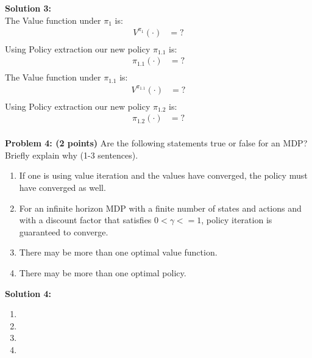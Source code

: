 \documentclass[]{article}
\begin{document}
\textbf{Solution 3:} \\
The Value function under $\pi_1$ is:\\
\begin{equation*}
\begin{split}
    V^{\pi_1}(\cdot) &= ? \\
\end{split}
\end{equation*}
Using Policy extraction our new policy $\pi_{1.1}$ is:
\begin{equation*}
\begin{split}
    \pi_{1.1}(\cdot) &= ? \\
\end{split}
\end{equation*}
The Value function under $\pi_{1.1}$ is:\\
\begin{equation*}
\begin{split}
    V^{\pi_{1.1}}(\cdot) &= ? \\
\end{split}
\end{equation*}
Using Policy extraction our new policy $\pi_{1.2}$ is:
\begin{equation*}
\begin{split}
    \pi_{1.2}(\cdot) &= ? \\
\end{split}
\end{equation*}

\clearpage
\textbf{Problem 4: (2 points)}
Are the following statements true or false for an MDP? Briefly explain why (1-3 sentences).
\begin{enumerate}[label=(\alph*)]
    \item If one is using value iteration and the values have converged, the policy must have converged as well.
    \item For an infinite horizon MDP with a finite number of states and actions and with a discount factor that satisfies $0 < \gamma <= 1$, policy iteration is guaranteed to converge.
    \item There may be more than one optimal value function.
    \item There may be more than one optimal policy.
\end{enumerate}

\bigskip

\textbf{Solution 4:}
\begin{enumerate}[label=(\alph*)]
    \item %
    \item %
    \item %
    \item %
\end{enumerate}
\end{document}

